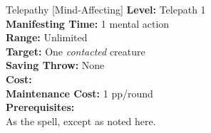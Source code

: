{Telepathy [Mind-Affecting]}
{
    \textbf{Level:}
    Telepath 1\\
    \textbf{Manifesting Time:}
    1 mental action\\
    \textbf{Range:}
    Unlimited\\
    \textbf{Target:}
    One \emph{contacted} creature\\
    \textbf{Saving Throw:}
    None\\
    \textbf{Cost:}
    \\
    \textbf{Maintenance Cost:}
    1 pp/round\\
    \textbf{Prerequisites:}
    \\
}
{
    As the  spell, except as noted here.
}
